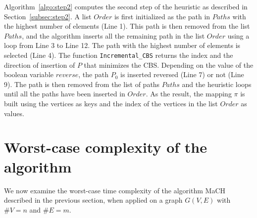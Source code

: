\documentclass{scrartcl}
\theoremstyle{plain}
\newcommand{\algo}{MaCH}
\newcommand{\cbs}{CBS}
\begin{document}
Algorithm~\ref{algo:step2} computes the second step of the heuristic as 
described in Section~\ref{subsec:step2}. A list $Order$ is first initialized as 
the path in $Paths$ with the highest number of elements (Line 1). This path is 
then removed from the list $Paths$, and the algorithm inserts all the remaining 
path in the list $Order$ using a loop from Line 3 to Line 12. The path with the 
highest number of elements is selected (Line 4). The function 
\texttt{Incremental\_CBS} returns the index and the direction of insertion of 
$P$ that minimizes the \cbs{}. Depending on the value of the boolean variable 
$reverse$, the path $P_0$ is inserted reversed (Line 7) or not (Line 9). The 
path is then removed from the list of paths $Paths$ and the heuristic loops 
until all the paths have been inserted in $Order$. As the result, the mapping 
$\pi$ is built using the vertices as keys and the index of the vertices in the 
list $Order$ as values.
 
\makeatletter{}\section{Worst-case complexity of the algorithm}
\label{sec:complexity}

We now examine the worst-case time complexity of the algorithm \algo{} described 
in the previous section, when applied on a graph $G(V,E)$ with $\# V=n$ and $\# 
E=m$. 
\end{document}
